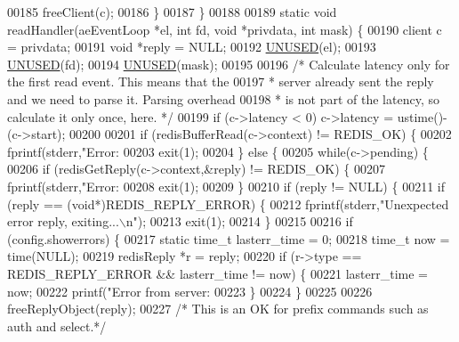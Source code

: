 \begin{DoxyCode}
00185         freeClient(c);
00186     \}
00187 \}
00188 
00189 \textcolor{keyword}{static} \textcolor{keywordtype}{void} readHandler(aeEventLoop *el, \textcolor{keywordtype}{int} fd, \textcolor{keywordtype}{void} *privdata, \textcolor{keywordtype}{int} mask) \{
00190     client c = privdata;
00191     \textcolor{keywordtype}{void} *reply = NULL;
00192     \hyperlink{server_8h_ae7c9dc8f13568a9c856573751f1ee1ec}{UNUSED}(el);
00193     \hyperlink{server_8h_ae7c9dc8f13568a9c856573751f1ee1ec}{UNUSED}(fd);
00194     \hyperlink{server_8h_ae7c9dc8f13568a9c856573751f1ee1ec}{UNUSED}(mask);
00195 
00196     \textcolor{comment}{/* Calculate latency only for the first read event. This means that the}
00197 \textcolor{comment}{     * server already sent the reply and we need to parse it. Parsing overhead}
00198 \textcolor{comment}{     * is not part of the latency, so calculate it only once, here. */}
00199     \textcolor{keywordflow}{if} (c->latency < 0) c->latency = ustime()-(c->start);
00200 
00201     \textcolor{keywordflow}{if} (redisBufferRead(c->context) != REDIS\_OK) \{
00202         fprintf(stderr,\textcolor{stringliteral}{"Error: %
00203         exit(1);
00204     \} \textcolor{keywordflow}{else} \{
00205         \textcolor{keywordflow}{while}(c->pending) \{
00206             \textcolor{keywordflow}{if} (redisGetReply(c->context,&reply) != REDIS\_OK) \{
00207                 fprintf(stderr,\textcolor{stringliteral}{"Error: %
00208                 exit(1);
00209             \}
00210             \textcolor{keywordflow}{if} (reply != NULL) \{
00211                 \textcolor{keywordflow}{if} (reply == (\textcolor{keywordtype}{void}*)REDIS\_REPLY\_ERROR) \{
00212                     fprintf(stderr,\textcolor{stringliteral}{"Unexpected error reply, exiting...\(\backslash\)n"});
00213                     exit(1);
00214                 \}
00215 
00216                 \textcolor{keywordflow}{if} (config.showerrors) \{
00217                     \textcolor{keyword}{static} time\_t lasterr\_time = 0;
00218                     time\_t now = time(NULL);
00219                     redisReply *r = reply;
00220                     \textcolor{keywordflow}{if} (r->type == REDIS\_REPLY\_ERROR && lasterr\_time != now) \{
00221                         lasterr\_time = now;
00222                         printf(\textcolor{stringliteral}{"Error from server: %
00223                     \}
00224                 \}
00225 
00226                 freeReplyObject(reply);
00227                 \textcolor{comment}{/* This is an OK for prefix commands such as auth and select.*/}
}}}
\end{DoxyCode}
